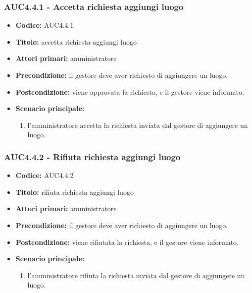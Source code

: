 \documentclass[casi-duso]{subfiles}
\begin{document}
\subsubsection{AUC4.4.1 - Accetta richiesta aggiungi luogo}%
\label{subsub:AUC4.4.1}
\begin{itemize}
  \item \textbf{Codice:} AUC4.4.1
  \item \textbf{Titolo:} accetta richiesta aggiungi luogo
  \item \textbf{Attori primari:} amministratore
  \item \textbf{Precondizione:} il gestore deve aver richiesto di aggiungere un luogo.
  \item \textbf{Postcondizione:} viene approvata la richiesta, e il gestore viene informato.
  \item \textbf{Scenario principale:}
  \begin{enumerate}
    \item  l'amministratore accetta la richiesta inviata dal gestore di aggiungere un luogo.
  \end{enumerate}
\end{itemize}

\subsubsection{AUC4.4.2 - Rifiuta richiesta aggiungi luogo}%
\label{subsub:AUC4.4.2}
\begin{itemize}
  \item \textbf{Codice:} AUC4.4.2
  \item \textbf{Titolo:} rifiuta richiesta aggiungi luogo
  \item \textbf{Attori primari:} amministratore
  \item \textbf{Precondizione:} il gestore deve aver richiesto di aggiungere un luogo.
  \item \textbf{Postcondizione:} viene rifiutata la richiesta, e il gestore viene informato.
  \item \textbf{Scenario principale:}
  \begin{enumerate}
    \item l'amministratore rifiuta la richiesta inviata dal gestore di aggiungere un luogo.
  \end{enumerate}
\end{itemize}
\end{document}
